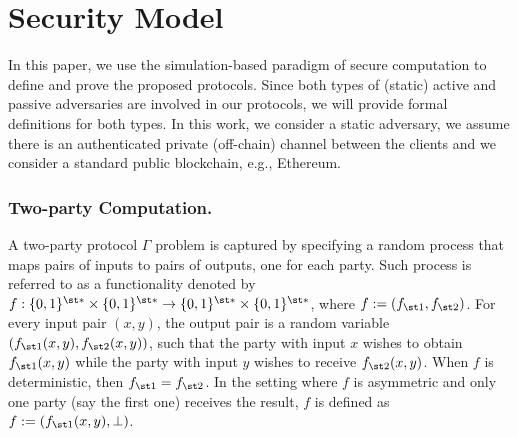 

\section{Security Model}\label{sec::sec-model}

In this paper, we use the simulation-based paradigm of secure computation \cite{DBLP:books/cu/Goldreich2004} to define and prove the proposed protocols. Since both types of (static) active and passive adversaries are involved in our protocols, we will provide formal definitions for both types. In this work, we consider a static adversary, we assume there is an authenticated private (off-chain) channel between the clients and we consider a standard public blockchain, e.g., Ethereum.
%
 
 \subsubsection{Two-party Computation.} A two-party protocol $\Gamma$ problem is captured by specifying a random process that maps pairs of inputs to pairs of outputs, one for each party. Such process is referred to as a functionality denoted by  $f:\{0,1\}^{\st *}\times\{0,1\}^{\st *}\rightarrow\{0,1\}^{\st *}\times\{0,1\}^{\st *}$, where $f:=(f_{\st 1},f_{\st 2})$. For every input pair $(x,y)$, the output pair is a random variable $(f_{\st 1} (x,y), f_{\st 2} (x,y))$, such that the party with input $x$ wishes to obtain $f_{\st 1} (x,y)$ while the party with input $y$ wishes to receive $f_{\st 2} (x,y)$. When $f$ is deterministic, then $f_{\st 1} =f_{\st 2}$. In the setting where $f$ is asymmetric and only one party (say the first one) receives the result, $f$ is defined as $f:=(f_{\st 1}(x,y), \bot)$. 
 
 
